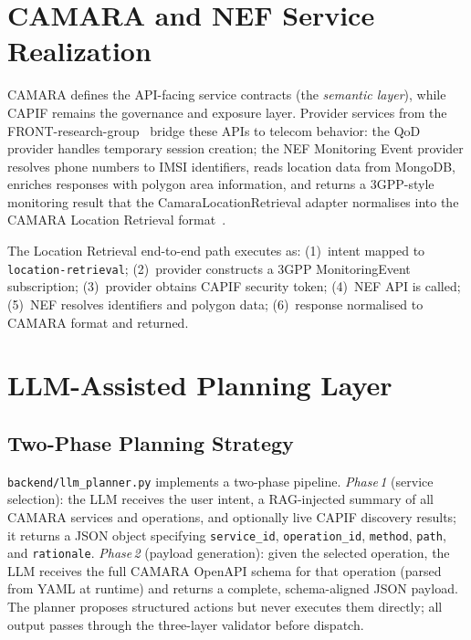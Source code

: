 \documentclass[conference]{IEEEtran}
\begin{document}
\section{CAMARA and NEF Service Realization}

CAMARA defines the API-facing service contracts (the \emph{semantic layer}),
while CAPIF remains the governance and exposure layer. Provider services from
the FRONT-research-group~\cite{turkovic2025} bridge these APIs to telecom
behavior: the QoD provider handles temporary session creation; the NEF
Monitoring Event provider resolves phone numbers to IMSI identifiers,
reads location data from MongoDB, enriches responses with polygon area
information, and returns a 3GPP-style monitoring result that the
CamaraLocationRetrieval adapter normalises into the CAMARA Location
Retrieval format~\cite{nefsim2022}.

The Location Retrieval end-to-end path executes as:
(1)~intent mapped to \texttt{location-retrieval};
(2)~provider constructs a 3GPP MonitoringEvent subscription;
(3)~provider obtains CAPIF security token;
(4)~NEF API is called;
(5)~NEF resolves identifiers and polygon data;
(6)~response normalised to CAMARA format and returned.

\section{LLM-Assisted Planning Layer}

\subsection{Two-Phase Planning Strategy}

\texttt{backend/llm\_planner.py} implements a two-phase pipeline.
\textit{Phase\,1} (service selection): the LLM receives the user intent,
a RAG-injected summary of all CAMARA services and operations, and
optionally live CAPIF discovery results; it returns a JSON object
specifying \texttt{service\_id}, \texttt{operation\_id}, \texttt{method},
\texttt{path}, and \texttt{rationale}.
\textit{Phase\,2} (payload generation): given the selected operation,
the LLM receives the full CAMARA OpenAPI schema for that operation
(parsed from YAML at runtime) and returns a complete, schema-aligned
JSON payload.
The planner proposes structured actions but never executes them directly;
all output passes through the three-layer validator before dispatch.
\end{document}
